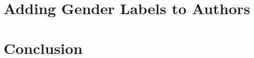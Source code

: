 \documentclass{article}
\begin{document}


\section{Adding Gender Labels to Authors}


\section{Conclusion}
\end{document}
